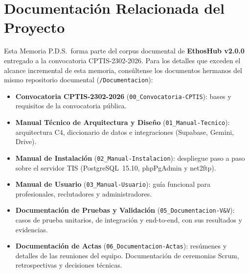 \section*{Documentación Relacionada del Proyecto}
Esta Memoria P.D.S.\ forma parte del corpus documental de \textbf{EthosHub v2.0.0} entregado a la
convocatoria CPTIS-2302-2026. Para los detalles que exceden el alcance incremental de esta
memoria, consúltense los documentos hermanos del mismo repositorio documental
(\texttt{/Documentacion}):
\begin{itemize}[noitemsep]
    \item \textbf{Convocatoria CPTIS-2302-2026} (\texttt{00\_Convocatoria-CPTIS}): bases y
    requisitos de la convocatoria pública.
    \item \textbf{Manual Técnico de Arquitectura y Diseño} (\texttt{01\_Manual-Tecnico}):
    arquitectura C4, diccionario de datos e integraciones (Supabase, Gemini, Drive).
    \item \textbf{Manual de Instalación} (\texttt{02\_Manual-Instalacion}): despliegue paso a paso
    sobre el servidor TIS (PostgreSQL~15.10, phpPgAdmin y net2ftp).
    \item \textbf{Manual de Usuario} (\texttt{03\_Manual-Usuario}): guía funcional para
    profesionales, reclutadores y administradores.
    \item \textbf{Documentación de Pruebas y Validación} (\texttt{05\_Documentacion-V\&V}): casos de prueba unitarios, de integración y end-to-end, con sus resultados y evidencias.
    \item \textbf{Documentación de Actas} (\texttt{06\_Documentacion-Actas}): resúmenes y detalles de las reuniones del equipo. Documentación de ceremonias Scrum, retrospectivas y decisiones técnicas.
\end{itemize}

\clearpage
